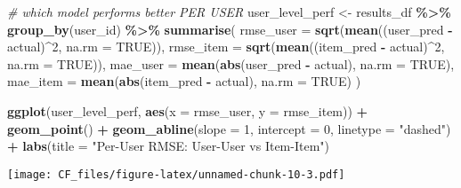 \documentclass[
]{article}
\newenvironment{Shaded}{\begin{snugshade}}{\end{snugshade}}
\newcommand{\AttributeTok}[1]{\textcolor[rgb]{0.13,0.29,0.53}{#1}}
\newcommand{\CommentTok}[1]{\textcolor[rgb]{0.56,0.35,0.01}{\textit{#1}}}
\newcommand{\ConstantTok}[1]{\textcolor[rgb]{0.56,0.35,0.01}{#1}}
\newcommand{\DecValTok}[1]{\textcolor[rgb]{0.00,0.00,0.81}{#1}}
\newcommand{\FunctionTok}[1]{\textcolor[rgb]{0.13,0.29,0.53}{\textbf{#1}}}
\newcommand{\NormalTok}[1]{#1}
\newcommand{\OtherTok}[1]{\textcolor[rgb]{0.56,0.35,0.01}{#1}}
\newcommand{\SpecialCharTok}[1]{\textcolor[rgb]{0.81,0.36,0.00}{\textbf{#1}}}
\newcommand{\StringTok}[1]{\textcolor[rgb]{0.31,0.60,0.02}{#1}}
\begin{document}
\begin{Shaded}
\begin{Highlighting}[]
\CommentTok{\# which model performs better PER USER}
\NormalTok{user\_level\_perf }\OtherTok{\textless{}{-}}\NormalTok{ results\_df }\SpecialCharTok{\%\textgreater{}\%}
  \FunctionTok{group\_by}\NormalTok{(user\_id) }\SpecialCharTok{\%\textgreater{}\%}
  \FunctionTok{summarise}\NormalTok{(}
    \AttributeTok{rmse\_user =} \FunctionTok{sqrt}\NormalTok{(}\FunctionTok{mean}\NormalTok{((user\_pred }\SpecialCharTok{{-}}\NormalTok{ actual)}\SpecialCharTok{\^{}}\DecValTok{2}\NormalTok{, }\AttributeTok{na.rm =} \ConstantTok{TRUE}\NormalTok{)),}
    \AttributeTok{rmse\_item =} \FunctionTok{sqrt}\NormalTok{(}\FunctionTok{mean}\NormalTok{((item\_pred }\SpecialCharTok{{-}}\NormalTok{ actual)}\SpecialCharTok{\^{}}\DecValTok{2}\NormalTok{, }\AttributeTok{na.rm =} \ConstantTok{TRUE}\NormalTok{)),}
    \AttributeTok{mae\_user =} \FunctionTok{mean}\NormalTok{(}\FunctionTok{abs}\NormalTok{(user\_pred }\SpecialCharTok{{-}}\NormalTok{ actual), }\AttributeTok{na.rm =} \ConstantTok{TRUE}\NormalTok{),}
    \AttributeTok{mae\_item =} \FunctionTok{mean}\NormalTok{(}\FunctionTok{abs}\NormalTok{(item\_pred }\SpecialCharTok{{-}}\NormalTok{ actual), }\AttributeTok{na.rm =} \ConstantTok{TRUE}\NormalTok{)}
\NormalTok{  )}

\FunctionTok{ggplot}\NormalTok{(user\_level\_perf, }\FunctionTok{aes}\NormalTok{(}\AttributeTok{x =}\NormalTok{ rmse\_user, }\AttributeTok{y =}\NormalTok{ rmse\_item)) }\SpecialCharTok{+}
  \FunctionTok{geom\_point}\NormalTok{() }\SpecialCharTok{+}
  \FunctionTok{geom\_abline}\NormalTok{(}\AttributeTok{slope =} \DecValTok{1}\NormalTok{, }\AttributeTok{intercept =} \DecValTok{0}\NormalTok{, }\AttributeTok{linetype =} \StringTok{"dashed"}\NormalTok{) }\SpecialCharTok{+}
  \FunctionTok{labs}\NormalTok{(}\AttributeTok{title =} \StringTok{"Per{-}User RMSE: User{-}User vs Item{-}Item"}\NormalTok{)}
\end{Highlighting}
\end{Shaded}

\texttt{[image: CF\_files/figure-latex/unnamed-chunk-10-3.pdf]}

\begin{Shaded}
\end{Shaded}
\end{document}
